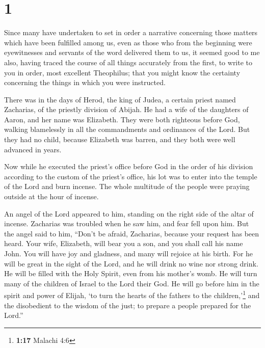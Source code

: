 \hypertarget{section}{%
\section{1}\label{section}}

 Since many have undertaken to set in order a narrative
concerning those matters which have been fulfilled among us,
 even as those who from the beginning were eyewitnesses
and servants of the word delivered them to us,  it seemed
good to me also, having traced the course of all things accurately from
the first, to write to you in order, most excellent Theophilus;
 that you might know the certainty concerning the things
in which you were instructed.

 There was in the days of Herod, the king of Judea, a
certain priest named Zacharias, of the priestly division of Abijah. He
had a wife of the daughters of Aaron, and her name was Elizabeth.
 They were both righteous before God, walking blamelessly
in all the commandments and ordinances of the Lord.  But
they had no child, because Elizabeth was barren, and they both were well
advanced in years.

 Now while he executed the priest's office before God in
the order of his division  according to the custom of the
priest's office, his lot was to enter into the temple of the Lord and
burn incense.  The whole multitude of the people were
praying outside at the hour of incense.

 An angel of the Lord appeared to him, standing on the
right side of the altar of incense.  Zacharias was
troubled when he saw him, and fear fell upon him.  But
the angel said to him, ``Don't be afraid, Zacharias, because your
request has been heard. Your wife, Elizabeth, will bear you a son, and
you shall call his name John.  You will have joy and
gladness, and many will rejoice at his birth.  For he
will be great in the sight of the Lord, and he will drink no wine nor
strong drink. He will be filled with the Holy Spirit, even from his
mother's womb.  He will turn many of the children of
Israel to the Lord their God.  He will go before him in
the spirit and power of Elijah, `to turn the hearts of the fathers to
the children,'\footnote{\textbf{1:17} Malachi 4:6} and the disobedient
to the wisdom of the just; to prepare a people prepared for the Lord.''

